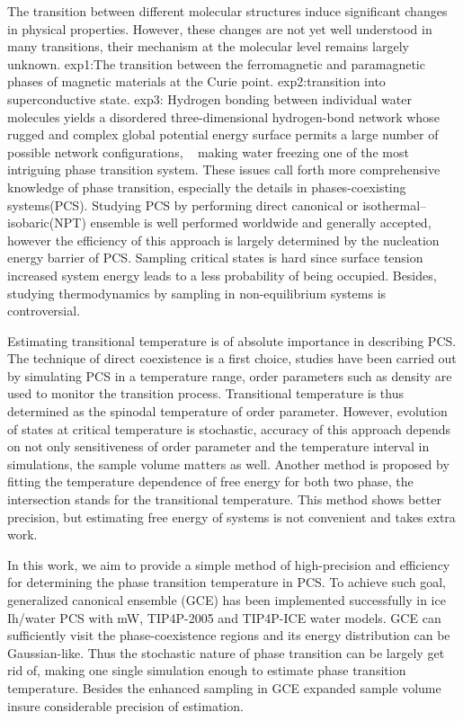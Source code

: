 \documentclass[aps,prl,twocolumn,superscriptaddress]{revtex4-1}
\begin{document}
The transition between different molecular structures induce significant changes in physical properties.  However, these changes are not yet well understood in many transitions, their mechanism at the molecular level remains largely unknown.
exp1:The transition between the ferromagnetic and paramagnetic phases of magnetic materials at the Curie point.
exp2:transition into superconductive state.
exp3: Hydrogen bonding between individual water molecules yields a disordered three-dimensional hydrogen-bond network whose rugged and complex global potential energy surface permits a large number of possible network configurations, ~\cite{Matsumoto2002} making water freezing one of the most intriguing phase transition system. 
These issues call forth more comprehensive knowledge of phase transition, especially the details in phases-coexisting systems(PCS). Studying PCS by performing direct canonical or isothermal–isobaric(NPT) ensemble is well performed worldwide and generally accepted, however the efficiency of this approach is largely determined by the nucleation energy barrier of PCS. Sampling critical states is hard since surface tension increased system energy leads to a less probability of being occupied. Besides, studying thermodynamics by sampling in non-equilibrium systems is controversial. 

Estimating transitional temperature is of absolute importance in describing PCS. The technique of direct coexistence is a first choice, studies have been carried out by simulating PCS in a temperature range, order parameters such as density are used to monitor the transition process. Transitional temperature is thus determined as the spinodal temperature of order parameter. However, evolution of states at critical temperature is stochastic, accuracy of this approach depends on not only sensitiveness of order parameter and the temperature interval in simulations, the sample volume matters as well. Another method is proposed by fitting the temperature dependence of free energy for both two phase, the intersection stands for the transitional temperature. This method shows better precision, but estimating free energy of systems is not convenient and takes extra work.

In this work, we aim to provide a simple method of high-precision and efficiency for determining the phase transition temperature in PCS. To achieve such goal, generalized canonical ensemble (GCE) has been implemented successfully in ice Ih/water PCS with mW, TIP4P-2005 and TIP4P-ICE water models. GCE can sufficiently visit the phase-coexistence regions and its energy distribution can be Gaussian-like. Thus the stochastic nature of phase transition can be largely get rid of, making one single simulation enough to estimate phase transition temperature. Besides the enhanced sampling in GCE expanded sample volume insure considerable precision of estimation.
\end{document}
